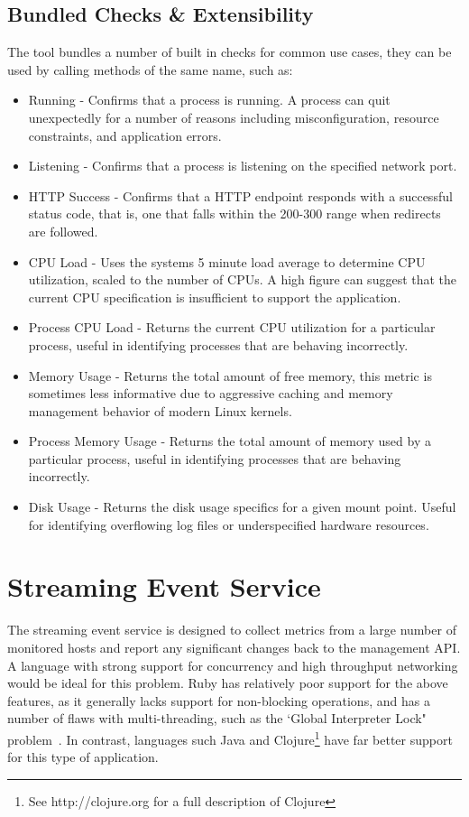 \documentclass{cshonours}
\begin{document}
\subsection{Bundled Checks \& Extensibility}

The tool bundles a number of built in checks for common use cases, they can be used by calling methods of the same name, such as:

\begin{itemize}
  \item {Running} - Confirms that a process is running. A process can quit unexpectedly for a number of reasons including misconfiguration, resource constraints, and application errors.
  \item {Listening} - Confirms that a process is listening on the specified network port.
  \item {HTTP Success} - Confirms that a HTTP endpoint responds with a successful status code, that is, one that falls within the 200-300 range when redirects are followed.
  \item {CPU Load} - Uses the systems 5 minute load average to determine CPU utilization, scaled to the number of CPUs. A high figure can suggest that the current CPU specification is insufficient to support the application.
  \item {Process CPU Load} - Returns the current CPU utilization for a particular process, useful in identifying processes that are behaving incorrectly.
  \item {Memory Usage} - Returns the total amount of free memory, this metric is sometimes less informative due to aggressive caching and memory management behavior of modern Linux kernels.
  \item {Process Memory Usage} - Returns the total amount of memory used by a particular process, useful in identifying processes that are behaving incorrectly.
  \item {Disk Usage} - Returns the disk usage specifics for a given mount point. Useful for identifying overflowing log files or underspecified hardware resources.
\end{itemize}

\pagebreak
\section{Streaming Event Service}

The streaming event service is designed to collect metrics from a large number of monitored hosts and report any significant changes back to the management API\@. A language with strong support for concurrency and high throughput networking would be ideal for this problem. Ruby has relatively poor support for the above features, as it generally lacks support for non-blocking operations, and has a number of flaws with multi-threading, such as the `Global Interpreter Lock" problem~\cite{RubyGIL}. In contrast, languages such Java and Clojure\footnote{See http://clojure.org for a full description of Clojure} have far better support for this type of application.
\end{document}

